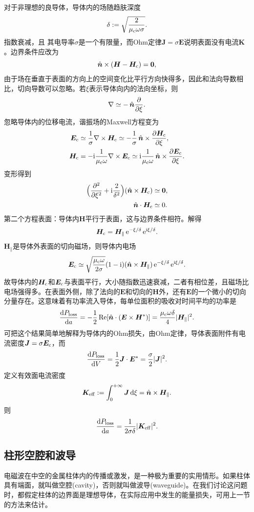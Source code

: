 对于非理想的良导体，导体内的场随趋肤深度
\begin{equation}
    \delta:=\sqrt{\frac2{\mu\c\omega\sigma}}.
\end{equation}
指数衰减，且
其电导率$\sigma$是一个有限量，而Ohm定律$\bm J=\sigma\bm E$说明表面没有电流$\bm K$。边界条件应改为
\[
    \uvec n\times(\bm H-\bm H\c)=\bm 0,
\]
由于场在垂直于表面的方向上的空间变化比平行方向快得多，因此和法向导数相比，切向导数可以忽略。若$\xi$表示导体向内的法向坐标，则
\[
    \nabla\simeq-\uvec n\pp\xi.
\]
忽略导体内的位移电流，谐振场的Maxwell方程变为
\begin{align*}
    \bm E\c&\simeq\frac1\sigma\curl\bm H\c\simeq-\frac1\sigma\uvec n\times\pv{\bm H\c}\xi,\\
    \bm H\c&=-\i\frac1{\mu\c\omega}\curl\bm E\c\simeq\i\frac1{\mu\c\omega}\uvec n\times\pv{\bm E\c}\xi.
\end{align*}
变形得到
\begin{align*}
    \Bigkh{\pp[2]\xi+\i\frac2{\delta^2}}(\uvec n\times\bm H\c)&\simeq\bm 0,\\
    \uvec n\cdot\bm H\c&\simeq 0.
\end{align*}
第二个方程表面：导体内$\bm H$平行于表面，这与边界条件相符。解得
\begin{equation}
    \bm H\c=\bm H_\parallel\e{-\xi/\delta}\e{\i\xi/\delta}.
\end{equation}
$\bm H_\parallel$是导体外表面的切向磁场，则导体内电场
\begin{equation}
    \bm E\c\simeq\sqrt{\frac{\mu\c\omega}{2\sigma}}(1-\i)(\uvec n\times\bm H_\parallel)\e{-\xi/\delta}\e{\i\xi/\delta}.
\end{equation}
故导体内的$\bm H\c$和$\bm E\c$与表面平行，大小随指数迅速衰减，二者有相位差，且磁场比电场强得多。在表面外侧，除了法向的$\bm E$和切向的$\bm H$外，还有$\bm E$的一个微小的切向分量存在。这意味着有功率流入导体，每单位面积的吸收对时间平均的功率是
\begin{equation}
    \dv{P_\text{loss}}a=-\frac12\Re[\uvec n\cdot(\bm E\times\bm H\cj)]=\frac{\mu\c\omega\delta}4|\bm H_\parallel|^2.
\end{equation}
可把这个结果简单地解释为导体内的Ohm损失，由Ohm定律，导体表面附件有电流密度$\bm J=\sigma\bm E\c$，而
\[
    \dv{P_\text{loss}}V=\frac12\bm J\cdot\bm E\cj=\frac\sigma 2|\bm J|^2.
\]
定义有效面电流密度
\[
    \bm K\eff:=\int\zti\bm J\d\xi=\uvec n\times\bm H_\parallel.
\]
则
\[
    \dv{P_\text{loss}}a=\frac1{2\sigma\delta}|\bm K\eff|^2.
\]
\subsection{柱形空腔和波导}
电磁波在中空的金属柱体内的传播或激发，是一种极为重要的实用情形。如果柱体具有端面，就叫做空腔(cavity)，否则就叫做波导(waveguide)。在我们讨论这问题时，都假定柱体的边界面是理想导体，在实际应用中发生的能量损失，可用上一节的方法来估计。

